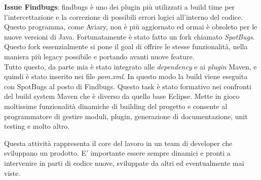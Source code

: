 \documentclass[a4paper]{article}
\begin{document}
\par \textbf{Issue Findbugs}: findbugs è uno dei plugin più utilizzati a build time 
per l'intercettazione e la correzione di possibili errori logici all'interno del codice.
Questo programma, come Aviary, non è più aggiornato ed ormai è obsoleto per le nuove
versioni di Java. Fortunatamente è stato fatto un fork chiamato \emph{SpotBugs}.
Questo fork essenzialmente si pone il goal di offrire le stesse funzionalità, nella
maniera più legacy possibile e portando avanti nuove feature.\\
Tutto questo, da parte mia è stato integrato alle \emph{dependency} e ai \emph{plugin}
Maven, e quindi è stato inserito nei file \emph{pom.xml}. In questo modo la build viene
eseguita con SpotBugs al posto di Findbugs. Questo task è stato formativo nei confronti
del build system Maven che è diverso da quello base Eclipse. Mette in gioco moltissime
funzionalità dinamiche di building del progetto e consente al programmatore di gestire
moduli, plugin, generazione di documentazione, unit testing e molto altro.
\par Questa attività rappresenta il core del lavoro in un team di developer che sviluppano
un prodotto. E' importante essere sempre dinamici e pronti a intervenire in parti di codice
nuove, sviluppate da altri ed eventualmente mai viste.
\\
\end{document}
